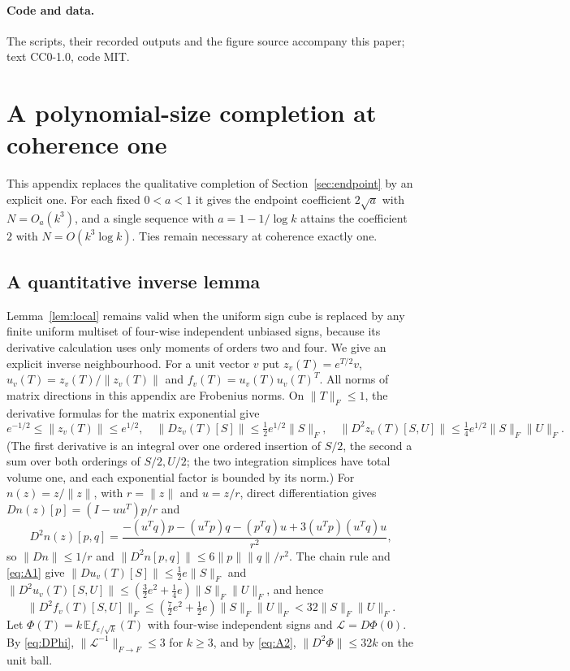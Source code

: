 \documentclass[11pt,a4paper]{article}
\theoremstyle{definition}
\numberwithin{equation}{section}
\begin{document}
\paragraph{Code and data.} The scripts, their recorded outputs and the figure source accompany this paper; text
CC0-1.0, code MIT.

\appendix
\section{A polynomial-size completion at coherence one}\label{app:A}

This appendix replaces the qualitative completion of Section~\ref{sec:endpoint} by an explicit one. For each fixed
$0<a<1$ it gives the endpoint coefficient $2\sqrt a$ with $N=O_a(k^3)$, and a single sequence with
$a=1-1/\log k$ attains the coefficient $2$ with $N=O(k^3\log k)$. Ties remain necessary at coherence exactly one.

\subsection{A quantitative inverse lemma}
Lemma~\ref{lem:local} remains valid when the uniform sign cube is replaced by any finite uniform multiset of
four-wise independent unbiased signs, because its derivative calculation uses only moments of orders two and four.
We give an explicit inverse neighbourhood. For a unit vector $v$ put
$z_v(T)=e^{T/2}v$, $u_v(T)=z_v(T)/\|z_v(T)\|$ and $f_v(T)=u_v(T)u_v(T)^T$. All norms of matrix directions in this
appendix are Frobenius norms. On $\|T\|_F\le1$, the derivative formulas for the matrix exponential give
\begin{equation}\label{eq:A1}
 e^{-1/2}\le\|z_v(T)\|\le e^{1/2},\quad \|Dz_v(T)[S]\|\le\tfrac12e^{1/2}\|S\|_F,\quad
 \|D^2z_v(T)[S,U]\|\le\tfrac14e^{1/2}\|S\|_F\|U\|_F.
\end{equation}
(The first derivative is an integral over one ordered insertion of $S/2$, the second a sum over both orderings of
$S/2,U/2$; the two integration simplices have total volume one, and each exponential factor is bounded by its norm.)
For $n(z)=z/\|z\|$, with $r=\|z\|$ and $u=z/r$, direct differentiation gives $Dn(z)[p]=(I-uu^T)p/r$ and
\[
 D^2n(z)[p,q]=\frac{-(u^Tq)p-(u^Tp)q-(p^Tq)u+3(u^Tp)(u^Tq)u}{r^2},
\]
so $\|Dn\|\le1/r$ and $\|D^2n[p,q]\|\le6\|p\|\|q\|/r^2$. The chain rule and \eqref{eq:A1} give
$\|Du_v(T)[S]\|\le\tfrac12e\|S\|_F$ and $\|D^2u_v(T)[S,U]\|\le(\tfrac32e^2+\tfrac14e)\|S\|_F\|U\|_F$, and hence
\begin{equation}\label{eq:A2}
 \|D^2f_v(T)[S,U]\|_F\le(\tfrac72e^2+\tfrac12e)\|S\|_F\|U\|_F<32\|S\|_F\|U\|_F.
\end{equation}
Let $\Phi(T)=k\,\mathbb Ef_{\varepsilon/\sqrt k}(T)$ with four-wise independent signs and $\mathcal L=D\Phi(0)$. By
\eqref{eq:DPhi}, $\|\mathcal L^{-1}\|_{F\to F}\le3$ for $k\ge3$, and by \eqref{eq:A2}, $\|D^2\Phi\|\le32k$ on the unit
ball.
\end{document}
